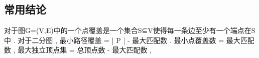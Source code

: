 ﻿\subsection{常用结论}
对于图G=(V,E)中的一个点覆盖是一个集合S⊆V使得每一条边至少有一个端点在S中 .
对于二分图 ,
最小路径覆盖 = | P | - 最大匹配数 .
最小点覆盖数 = 最大匹配数 ,
最大独立顶点集 = 总顶点数 - 最大匹配数 ,
